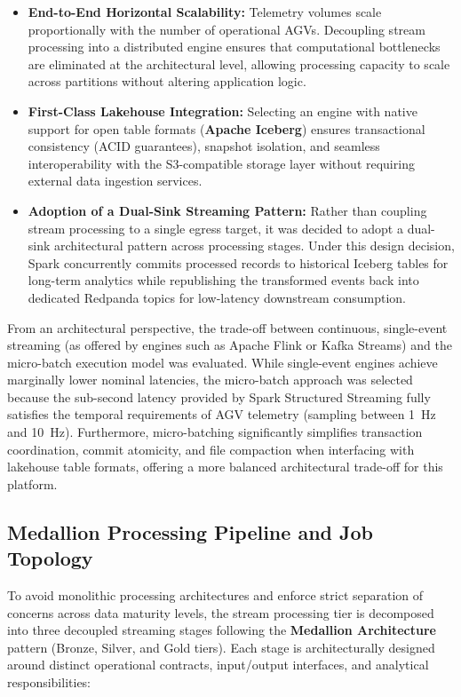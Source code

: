 \begin{itemize}
    \item \textbf{End-to-End Horizontal Scalability:} Telemetry volumes scale proportionally with the number of operational AGVs.
    Decoupling stream processing into a distributed engine ensures that computational bottlenecks are eliminated at the architectural level, allowing processing capacity to scale across partitions without altering application logic.

    \item \textbf{First-Class Lakehouse Integration:} Selecting an engine with native support for open table formats (\textbf{Apache Iceberg}) ensures transactional consistency (ACID guarantees), snapshot isolation, and seamless interoperability with the S3-compatible storage layer without requiring external data ingestion services.

    \item \textbf{Adoption of a Dual-Sink Streaming Pattern:} Rather than coupling stream processing to a single egress target, it was decided to adopt a dual-sink architectural pattern across processing stages.
    Under this design decision, Spark concurrently commits processed records to historical Iceberg tables for long-term analytics while republishing the transformed events back into dedicated Redpanda topics for low-latency downstream consumption.
\end{itemize}

From an architectural perspective, the trade-off between continuous, single-event streaming (as offered by engines such as Apache Flink or Kafka Streams) and the micro-batch execution model was evaluated.
While single-event engines achieve marginally lower nominal latencies, the micro-batch approach was selected because the sub-second latency provided by Spark Structured Streaming fully satisfies the temporal requirements of AGV telemetry (sampling between 1~Hz and 10~Hz).
Furthermore, micro-batching significantly simplifies transaction coordination, commit atomicity, and file compaction when interfacing with lakehouse table formats, offering a more balanced architectural trade-off for this platform.

\subsection{Medallion Processing Pipeline and Job Topology}

To avoid monolithic processing architectures and enforce strict separation of concerns across data maturity levels, the stream processing tier is decomposed into three decoupled streaming stages following the \textbf{Medallion Architecture} pattern (Bronze, Silver, and Gold tiers).
Each stage is architecturally designed around distinct operational contracts, input/output interfaces, and analytical responsibilities:

